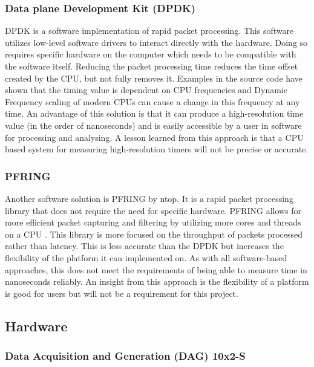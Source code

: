 \subsubsection{Data plane Development Kit (DPDK)}

DPDK is a software implementation of rapid packet processing. 
This software utilizes low-level software drivers to interact directly with the hardware. 
Doing so requires specific hardware on the computer which needs to be compatible with the software itself.
Reducing the packet processing time reduces the time offset created by the CPU, but not fully removes it. 
Examples in the source code have shown that the timing value is dependent on CPU frequencies \cite{dpdkcode} 
and Dynamic Frequency scaling \cite{turboboost} of modern CPUs can cause a change in this frequency at any time.
An advantage of this solution is that it can produce a high-resolution time value (in the order of nanoseconds) 
and is easily accessible by a user in software for processing and analysing. 
A lesson learned from this approach is that a CPU based system for measuring high-resolution timers will not be precise or accurate.

\subsubsection{PF\textunderscore RING}

Another software solution is PF\textunderscore RING by ntop\texttrademark. 
It is a rapid packet processing library that does not require the need for specific hardware.  
PF\textunderscore RING allows for more efficient packet capturing and filtering by utilizing more cores and threads on a CPU \cite{pfringworks}.
This library is more focused on the throughput of packets processed rather than latency. 
This is less accurate than the DPDK but increases the flexibility of the platform it can implemented on. 
As with all software-based approaches, this does not meet the requirements of being able to measure time in nanoseconds reliably.
An insight from this approach is the flexibility of a platform is good for users but will not be a requirement for this project.

\subsection{Hardware}

\subsubsection{Data Acquisition and Generation (DAG) 10x2-S}

